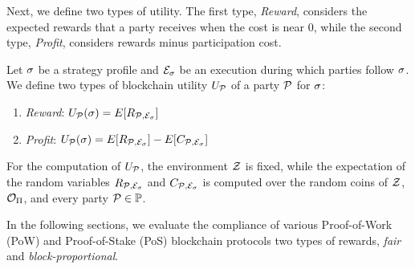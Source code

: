 Next, we define two types of utility. The first type, \emph{Reward}, considers
the expected rewards that a party receives when the cost is near $0$, while the
second type, \emph{Profit}, considers rewards minus participation cost.

\begin{definition}\label{def:utility}
    Let $\sigma$ be a strategy profile and $\mathcal{E}_\sigma$ be an
    execution during which parties follow $\sigma$. We define two types of
    blockchain utility $U_{\mathcal{P}}$ of a party $\mathcal{P}$ for $\sigma$:
    \begin{enumerate}
        \item \emph{Reward}: $U_{\mathcal{P}}(\sigma) = E[R_{\mathcal{P}, \mathcal{E}_\sigma}]$
        \item \emph{Profit}: $U_{\mathcal{P}}(\sigma) = E[R_{\mathcal{P}, \mathcal{E}_\sigma}] - E[C_{\mathcal{P}, \mathcal{E}_\sigma}]$
    \end{enumerate}
\end{definition}

For the computation of $U_{\mathcal{P}}$, the
environment $\mathcal{Z}$ is fixed, while the
expectation of the random variables $R_{\mathcal{P}, \mathcal{E}_\sigma}$
and $C_{\mathcal{P}, \mathcal{E}_\sigma}$ is computed over the random coins of $\mathcal{Z}$, $\mathcal{O}_\Pi$, and every party $\mathcal{P} \in \mathbb{P}$.\smallskip

In the following sections, we evaluate the compliance of various Proof-of-Work (PoW) and Proof-of-Stake (PoS)
blockchain protocols \wrt two types of rewards, \emph{fair} and
\emph{block-proportional}.
